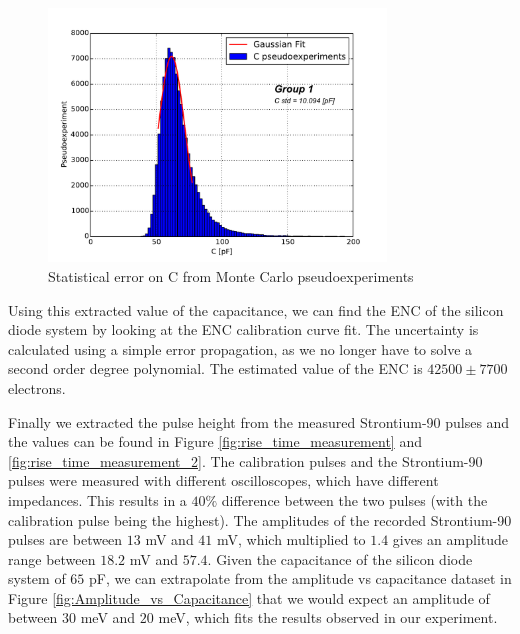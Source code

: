 \documentclass[12pt]{article}
\begin{document}
\begin{figure}[h!]
  \centering
  \includegraphics[width=0.8\textwidth]{./graphics/stat_error_on_C_pseudoexperiments}
  \caption{Statistical error on C from Monte Carlo pseudoexperiments}
  \label{fig:stat_error_on_C}
\end{figure}

Using this extracted value of the capacitance, we can find the ENC of the silicon diode system by looking at the ENC calibration curve fit. The uncertainty is calculated using a simple error propagation, as we no longer have to solve a second order degree polynomial. The estimated value of the ENC is $42500 \pm 7700$ electrons.

Finally we extracted the pulse height from the measured Strontium-90 pulses and the values can be found in Figure \ref{fig:rise_time_measurement} and \ref{fig:rise_time_measurement_2}. The calibration pulses and the Strontium-90 pulses were measured with different oscilloscopes, which have different impedances. This results in a $40\%$ difference between the two pulses (with the calibration pulse being the highest). The amplitudes of the recorded Strontium-90 pulses are between $13$ mV and $41$ mV, which multiplied to $1.4$ gives an amplitude range between $18.2$ mV and $57.4$. Given the capacitance of the silicon diode system of $65$ pF, we can extrapolate from the amplitude vs capacitance dataset in Figure \ref{fig:Amplitude_vs_Capacitance} that we would expect an amplitude of between $30$ meV and $20$ meV, which fits the results observed in our experiment.


%
%
\end{document}

